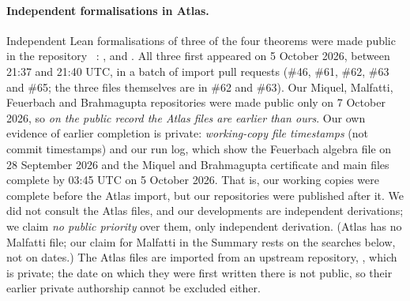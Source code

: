\documentclass[11pt]{article}
\theoremstyle{definition}
\theoremstyle{remark}
\begin{document}
\paragraph{Independent formalisations in Atlas.} Independent Lean
formalisations of three of the four theorems were made public in the repository
~\cite{Atlas}: ,
 and . All three first appeared on
5 October 2026, between 21:37 and 21:40 UTC, in a batch of import pull requests (\#46, \#61, \#62,
\#63 and \#65; the three files themselves are in \#62 and \#63). Our Miquel, Malfatti, Feuerbach
and Brahmagupta repositories were made public only on 7 October 2026, so \emph{on the public
record the Atlas files are earlier than ours}. Our own evidence of earlier completion is private:
\emph{working-copy file timestamps} (not commit timestamps) and our run log, which show the
Feuerbach algebra file on 28 September 2026 and the Miquel and Brahmagupta certificate and main
files complete by 03:45 UTC on 5 October 2026. That is, our working copies were complete before
the Atlas import, but our repositories were published after it. We did not consult the Atlas
files, and our developments are independent derivations; we claim \emph{no public priority} over
them, only independent derivation. (Atlas has no Malfatti file; our claim for Malfatti in the
Summary rests on the searches below, not on dates.) The Atlas files are imported from an upstream repository,
, which is private; the date on which they were first written
there is not public, so their earlier private authorship cannot be excluded either.
\end{document}
